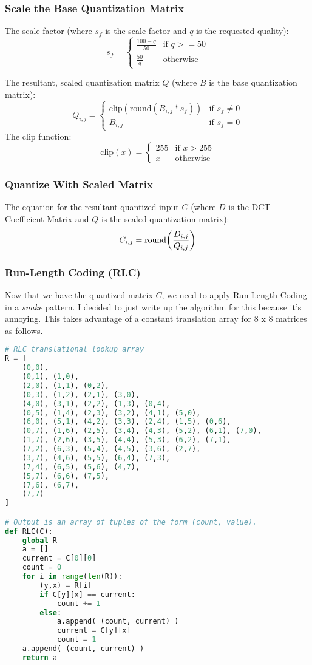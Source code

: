 \documentclass{article}
\begin{document}
\subsubsection{Scale the Base Quantization Matrix}

The scale factor (where $s_{f}$ is the scale factor and $q$ is the requested quality):
\[
s_{f} =
\begin{cases}
\frac{100 - q}{50} & \text{if\ } q >= 50 \\
\frac{50}{q} & \text{otherwise}
\end{cases}
\]

\noindent
The resultant, scaled quantization matrix $Q$ (where $B$ is the base quantization matrix):
\[
Q_{i,j} =
\begin{cases}
\text{clip}(\text{round}(B_{i,j} * s_{f})) & \text{if\ } s_{f} \ne 0 \\
B_{i,j} & \text{if\ } s_{f} = 0
\end{cases}
\]
\noindent
The clip function:
\[
\text{clip}(x) =
\begin{cases}
255 & \text{if\ } x > 255 \\
x & \text{otherwise}
\end{cases}
\]

\subsubsection{Quantize With Scaled Matrix}

The equation for the resultant quantized input $C$ (where $D$ is the DCT Coefficient Matrix
and $Q$ is the scaled quantization matrix):
\[
C_{i,j} = \text{round}\bigg{(}\frac{D_{i,j}}{Q_{i,j}}\bigg{)}
\]

\subsubsection{Run-Length Coding (RLC)}

Now that we have the quantized matrix $C$, we need to apply Run-Length Coding
in a \textit{snake} pattern.  I decided to just write up the algorithm for this
because it's annoying.  This takes advantage of a constant translation array
for 8 x 8 matrices as follows.
\newpage
\begin{lstlisting}[language=python]
# RLC translational lookup array
R = [
    (0,0),
    (0,1), (1,0),
    (2,0), (1,1), (0,2),
    (0,3), (1,2), (2,1), (3,0),
    (4,0), (3,1), (2,2), (1,3), (0,4),
    (0,5), (1,4), (2,3), (3,2), (4,1), (5,0),
    (6,0), (5,1), (4,2), (3,3), (2,4), (1,5), (0,6),
    (0,7), (1,6), (2,5), (3,4), (4,3), (5,2), (6,1), (7,0),
    (1,7), (2,6), (3,5), (4,4), (5,3), (6,2), (7,1),
    (7,2), (6,3), (5,4), (4,5), (3,6), (2,7),
    (3,7), (4,6), (5,5), (6,4), (7,3),
    (7,4), (6,5), (5,6), (4,7),
    (5,7), (6,6), (7,5),
    (7,6), (6,7),
	(7,7)
]

# Output is an array of tuples of the form (count, value).
def RLC(C):
	global R
	a = []
	current = C[0][0]
	count = 0
	for i in range(len(R)):
		(y,x) = R[i]
		if C[y][x] == current:
			count += 1
		else:
			a.append( (count, current) )
			current = C[y][x]
			count = 1
	a.append( (count, current) )
	return a
\end{lstlisting}
\end{document}
